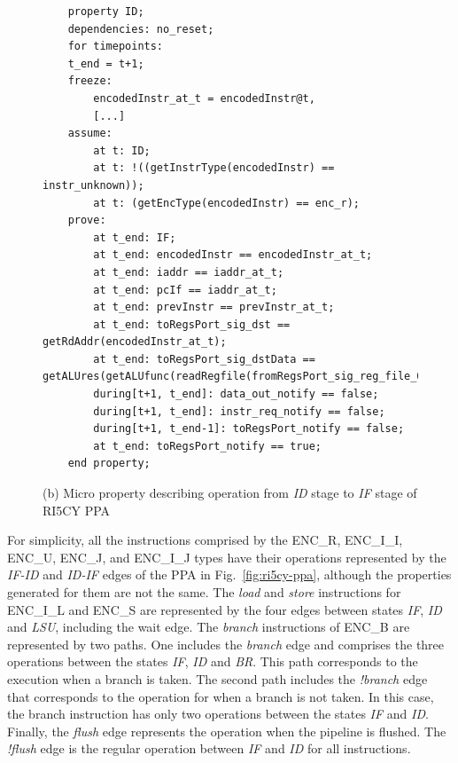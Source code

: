\begin{figure}[htb]
\ContinuedFloat
    \begin{lstlisting}
    property ID;
    dependencies: no_reset;
    for timepoints:
    t_end = t+1;
    freeze:
        encodedInstr_at_t = encodedInstr@t,
        [...]
    assume:
        at t: ID;
        at t: !((getInstrType(encodedInstr) == instr_unknown));
        at t: (getEncType(encodedInstr) == enc_r);
    prove:
        at t_end: IF;
        at t_end: encodedInstr == encodedInstr_at_t;
        at t_end: iaddr == iaddr_at_t;
        at t_end: pcIf == iaddr_at_t;
        at t_end: prevInstr == prevInstr_at_t;
        at t_end: toRegsPort_sig_dst == getRdAddr(encodedInstr_at_t);
        at t_end: toRegsPort_sig_dstData == getALUres(getALUfunc(readRegfile(fromRegsPort_sig_reg_file_01_at_t,...),getRs1Addr(),getRs2Addr());
        during[t+1, t_end]: data_out_notify == false;
        during[t+1, t_end]: instr_req_notify == false;
        during[t+1, t_end-1]: toRegsPort_notify == false;
        at t_end: toRegsPort_notify == true;
    end property;\end{lstlisting}
    \caption{(b) Micro property describing operation from \textit{ID} stage to \textit{IF} stage of RI5CY PPA}
    \label{fig:ri5cy-if-id-micro-ppt-b}
\end{figure}

For simplicity, all the instructions comprised by the ENC\_R, ENC\_I\_I, ENC\_U, ENC\_J, and ENC\_I\_J types have their operations represented by the \textit{IF-ID} and \textit{ID-IF} edges of the PPA in Fig.~\ref{fig:ri5cy-ppa}, although the properties generated for them are not the same. The \textit{load} and \textit{store} instructions for ENC\_I\_L and ENC\_S are represented by the four edges between states \textit{IF}, \textit{ID} and \textit{LSU}, including the wait edge. The \textit{branch} instructions of ENC\_B are represented by two paths. One includes the \textit{branch} edge and comprises the three operations between the states \textit{IF}, \textit{ID} and \textit{BR}. This path corresponds to the execution when a branch is taken. The second path includes the \textit{!branch} edge that corresponds to the operation for when a branch is not taken. In this case, the branch instruction has only two operations between the states \textit{IF} and \textit{ID}. Finally, the \textit{flush} edge represents the operation when the pipeline is flushed. The \textit{!flush} edge is the regular operation between \textit{IF} and \textit{ID} for all instructions.

